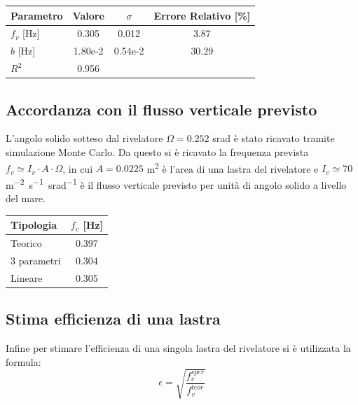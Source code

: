 \documentclass[a4paper,12pt]{article}
\begin{document}
\begin{table}[H]
    \centering
    \begin{tabular}{
        l
        S[table-format=1.3e2]  
        S[table-format=1.3e2]
        S[table-format=2.2]  
    }
        \toprule
        {Parametro} & {Valore} & {$\sigma$} & {Errore Relativo [\%]} \\
        \midrule
        $f_v$ [\unit{Hz}] & 0.305 & 0.012 & 3.87 \\
        $b$ [\unit{Hz}] & 1.80e-2 & 0.54e-2 & 30.29 \\
        $R^2$ & 0.956 &  &  \\
        \bottomrule
    \end{tabular}
    \label{tab:Fit lin}
\end{table}

\subsection{Accordanza con il flusso verticale previsto}
L'angolo solido sotteso dal rivelatore $\Omega = 0.252$ \unit{srad} è stato ricavato tramite simulazione Monte Carlo. Da questo si è ricavato la frequenza prevista $f_v \simeq I_v \cdot A \cdot \Omega $, in cui $A = 0.0225$ \unit{m^2} è l'area di una lastra del rivelatore e $I_v \simeq 70$ \unit{m^{-2} s^{-1} srad^{-1}} è il flusso verticale previsto per unità di angolo solido a livello del mare.
\begin{table}[H] 
    \centering
    \begin{tabular}{
        l
        S[table-format=1.3]  
    }
        \toprule
        {Tipologia} & {$f_v$ [\unit{Hz}]}\\
        \midrule
        Teorico & 0.397 \\
        3 parametri & 0.304 \\
        Lineare & 0.305 \\
        \bottomrule
    \end{tabular}

    \label{tab:Flusso verticale}
\end{table}

\subsection{Stima efficienza di una lastra}
Infine per stimare l'efficienza di una singola lastra del rivelatore si è utilizzata la formula:
\begin{equation}
    \epsilon = \sqrt{\frac{f_v^{sper}}{f_v^{teor}}}
\end{equation}
\end{document}
